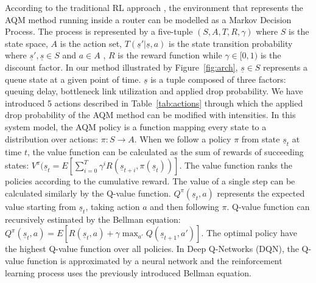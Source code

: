 \documentclass[conference]{IEEEtran}
\begin{document}
According to the traditional RL approach \cite{dqn,dqnint}, the environment that represents the AQM method running inside a router can be modelled as a Markov Decision Process. The process is represented by a five-tuple $(S, A, T, R, \gamma)$ where $S$ is the state space, $A$ is the action set, $T(\underline{s}'|\underline{s},a)$ is the state transition probability where $\underline{s}',\underline{s} \in S$ and $a \in A$ , $R$ is the reward function while $\gamma \in [0,1)$ is the discount factor. In our method illustrated by Figure~\ref{fig:arch}, $\underline{s} \in S$ represents a queue state at a given point of time. $\underline{s}$ is a tuple composed of three factors: queuing delay, bottleneck link utilization and applied drop probability. We have introduced 5 actions described in Table~\ref{tab:actions} through which the applied drop probability of the AQM method can be modified with intensities. In this system model, the AQM policy is a function mapping every state to a distribution over actions: $\pi : S \longrightarrow A$. When we follow a policy $\pi$ from state $\underline{s}_t$ at time $t$, the value function can be calculated as the sum of rewards of succeeding states: $V^{\pi}(\underline{s}_t = E[ \sum^T_{i=0}\gamma^iR(\underline{s}_{t+i}, \pi(\underline{s}_t))]$. The value function ranks the policies according to the cumulative reward. The value of a single step can be calculated similarly by the Q-value function. $Q^{\pi}(\underline{s}_t,a)$ represents the expected value starting from $\underline{s}_t$, taking action $a$ and then following $\pi$. Q-value function can recursively estimated by the Bellman equation: $Q^\pi(\underline{s}_t,a) = E[R(\underline{s}_t, a) + \gamma \max_{a'}Q(\underline{s}_{t+1},a')]$. The optimal policy have the highest Q-value function over all policies. In Deep Q-Networks (DQN), the Q-value function is approximated by a neural network and the reinforcement learning process uses the previously introduced Bellman equation.
\end{document}
